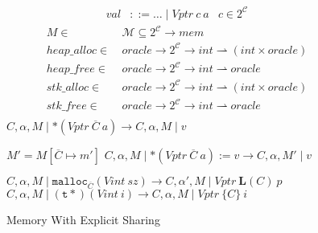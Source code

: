 \documentclass{article}
\begin{document}
\begin{figure}
    \[\begin{aligned}
    \mathit{val} & ::= \ldots \mid \mathit{Vptr} ~ c ~ a &
    c \in 2^{\mathcal{C}}
    \end{aligned}\]
    \[\begin{split}
    M \in ~ & \mathcal{M} \subseteq 2^{\mathcal{C}} \rightarrow \mathit{mem} \\
    \mathit{heap\_alloc} \in ~ & \mathit{oracle} \rightarrow
    2^{\mathcal{C}} \rightarrow \mathit{int} \rightharpoonup
    (\mathit{int} \times \mathit{oracle}) \\
    \mathit{heap\_free} \in ~ & \mathit{oracle} \rightarrow 2^{\mathcal{C}} \rightarrow
    \mathit{int} \rightharpoonup \mathit{oracle} \\
    \mathit{stk\_alloc} \in ~ & \mathit{oracle} \rightarrow
    2^{\mathcal{C}} \rightarrow \mathit{int} \rightharpoonup
    (\mathit{int} \times \mathit{oracle}) \\
    \mathit{stk\_free} \in ~ & \mathit{oracle} \rightarrow 2^{\mathcal{C}} \rightarrow
    \mathit{int} \rightharpoonup \mathit{oracle} \\
    \end{split}\]
             {\(C, \alpha, M \mid *(\mathit{Vptr} ~ \overline{C} ~ a)
               \longrightarrow C, \alpha, M \mid v\)}

                {\(M' = M[\overline{C} \mapsto m']\)}
                {\(C, \alpha, M \mid *(\mathit{Vptr} ~ \overline{C} ~ a) := v
                  \longrightarrow C, \alpha, M' \mid v\)}

             {\(C, \alpha, M \mid \mathtt{malloc}_{\overline{C}}(\mathit{Vint} ~ sz)
               \longrightarrow C, \alpha', M \mid \mathit{Vptr} ~ \mathbf{L}(C) ~ p\)}
    \judgment{}
             {\(C,\alpha,M \mid \mathtt{(t*)} (\mathit{Vint} ~ i) \longrightarrow
               C,\alpha,M \mid \mathit{Vptr} ~ \{C\} ~ \mathit{i}\)}

  \caption{Memory With Explicit Sharing}
  \label{fig:powerset}
\end{figure}
\end{document}
